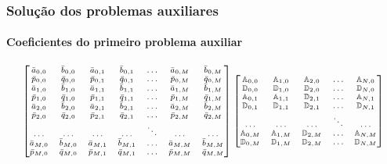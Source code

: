 \documentclass{beamer}
\begin{document}
\begin{frame}
	\frametitle{Solução dos problemas auxiliares}
	\framesubtitle{Coeficientes do primeiro problema auxiliar}
	\begin{align*}
	\scriptsize \begin{bmatrix}
	\bar{a}_{0,0} & \bar{b}_{0,0} & \bar{a}_{0,1} & \bar{b}_{0,1} &  \ldots & \bar{a}_{0,M} & \bar{b}_{0,M} \\
	\bar{p}_{0,0} & \bar{q}_{0,0} & \bar{p}_{0,1} & \bar{q}_{0,1} &  \ldots & \bar{p}_{0,M} & \bar{q}_{0,M} \\
	\bar{a}_{1,0} & \bar{b}_{1,0} & \bar{a}_{1,1} & \bar{b}_{1,1} &  \ldots & \bar{a}_{1,M} & \bar{b}_{1,M} \\
	\bar{p}_{1,0} & \bar{q}_{1,0} & \bar{p}_{1,1} & \bar{q}_{1,1} &  \ldots & \bar{p}_{1,M} & \bar{q}_{1,M} \\
	\bar{a}_{2,0} & \bar{b}_{2,0} & \bar{a}_{2,1} & \bar{b}_{2,1} &  \ldots & \bar{a}_{2,M} & \bar{b}_{2,M} \\
	\bar{p}_{2,0} & \bar{q}_{2,0} & \bar{p}_{2,1} & \bar{q}_{2,1} &  \ldots & \bar{p}_{2,M} & \bar{q}_{2,M} \\
	\ldots & \ldots & \ldots & \ldots & \ddots & \ldots & \ldots\\
	\bar{a}_{M,0} & \bar{b}_{M,0} & \bar{a}_{M,1} & \bar{b}_{M,1} &  \ldots & \bar{a}_{M,M} & \bar{b}_{M,M} \\
	\bar{p}_{M,0} & \bar{q}_{M,0} & \bar{p}_{M,1} & \bar{q}_{M,1} &  \ldots & \bar{p}_{M,M} & \bar{q}_{M,M}
	\end{bmatrix}
	\begin{bmatrix}
	\mathbb{A}_{0,0} & \mathbb{A}_{1,0} & \mathbb{A}_{2,0} & \ldots & \mathbb{A}_{N,0} \\
	\mathbb{D}_{0,0} & \mathbb{D}_{1,0} & \mathbb{D}_{2,0} & \ldots & \mathbb{D}_{N,0} \\
	\mathbb{A}_{0,1} & \mathbb{A}_{1,1} & \mathbb{D}_{2,1} & \ldots & \mathbb{A}_{N,1} \\
	\mathbb{D}_{0,1} & \mathbb{D}_{1,1} & \mathbb{D}_{2,1} & \ldots & \mathbb{D}_{N,1} \\
	\ldots & \ldots & \ldots & \ddots & \ldots \\
	\mathbb{A}_{0,M} & \mathbb{A}_{1,M} & \mathbb{D}_{2,M} & \ldots & \mathbb{A}_{N,M} \\
	\mathbb{D}_{0,M} & \mathbb{D}_{1,M} & \mathbb{D}_{2,M} & \ldots & \mathbb{D}_{N,M}
	\end{bmatrix}
	\end{align*}
	

\end{frame}
\end{document}
